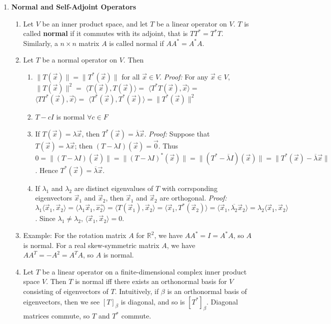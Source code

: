 \documentclass[10pt]{article}
\begin{document}
\begin{multicols*}{2}
\begin{enumerate}
    \item \textbf{Normal and Self-Adjoint Operators}
    \begin{enumerate}
        \item Let $V$ be an inner product space, and let $T$ be a linear operator on $V$. $T$ is called \textbf{normal} if it commutes with its adjoint, that is $TT^*=T^*T$. Similarly, a $n \times n$ matrix $A$ is called normal if $AA^* = A^*A$.
        \item Let $T$ be a normal operator on $V$. Then
        \begin{enumerate}
            \item $\| T(\vec{x}) \| = \| T^*(\vec{x}) \|$ for all $\vec{x} \in V$. \textit{Proof:} For any $\vec{x} \in V$, $\| T(\vec{x}) \|^2 =$ $\langle T(\vec{x}), T(\vec{x}) \rangle =$ $\langle T^*T(\vec{x}), \vec{x} \rangle =$ $\langle TT^*(\vec{x}), \vec{x} \rangle =$ $\langle T^*(\vec{x}), T^*(\vec{x}) \rangle = \| T^*(\vec{x}) \|^2$
            \item $T-cI$ is normal $\forall c \in F$ 
            \item If $T(\vec{x}) = \lambda \vec{x}$, then $T^*(\vec{x}) = \overline{\lambda} \vec{x}$. \textit{Proof:} Suppose that $T(\vec{x})=\lambda\vec{x}$; then $(T-\lambda I)(\vec{x}) = \vec{0}$. Thus $0 = \| (T-\lambda I)(\vec{x}) \| = \| (T-\lambda I)^*(\vec{x}) \| = \| (T^* - \overline{\lambda} I)(\vec{x}) \| = \| T^*(\vec{x}) - \overline{\lambda}\vec{x} \|$. Hence $T^*(\vec{x}) = \overline{\lambda}\vec{x}$.
            \item If $\lambda_1$ and $\lambda_2$ are distinct eigenvalues of $T$ with corrsponding eigenvectors $\vec{x}_1$ and $\vec{x}_2$, then $\vec{x}_1$ and $\vec{x}_2$ are orthogonal. \textit{Proof:} $\lambda_1 \langle \vec{x}_1, \vec{x}_2 \rangle = \langle \lambda_1 \vec{x}_1, \vec{x_2} \rangle = \langle T(\vec{x}_1), \vec{x}_2 \rangle = \langle \vec{x}_1, T^*(\vec{x}_2) \rangle = \langle \vec{x}_1, \overline{\lambda_2}\vec{x}_2 \rangle = \lambda_2 \langle \vec{x}_1, \vec{x}_2 \rangle$. Since $\lambda_1 \neq \lambda_2$, $\langle\vec{x}_1,\vec{x}_2 \rangle = 0$.
        \end{enumerate}
        \item Example: For the rotation matrix $A$ for $\mathbb{R}^2$, we have $AA^* = I = A^*A$, so $A$ is normal. For a real skew-symmetric matrix $A$, we have $AA^T = -A^2 = A^TA$, so $A$ is normal.
        \item Let $T$ be a linear operator on a finite-dimensional complex inner product space $V$. Then $T$ is normal iff there exists an orthonormal basis for $V$ consisting of eigenvectors of $T$. Intuitively, if $\beta$ is an orthonormal basis of eigenvectors, then we see $[T]_\beta$ is diagonal, and so is $[T^*]_\beta$. Diagonal matrices commute, so $T$ and $T^*$ commute.

\end{enumerate}
\end{enumerate}
\end{multicols*}
\end{document}
